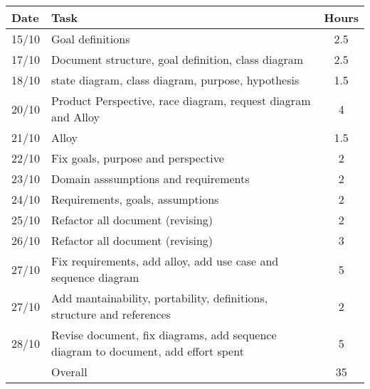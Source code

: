 \begin{table}[H]
\begin{tabularx}{\textwidth}{|l|X|c|}
\hline
\rowcolor[HTML]{C0C0C0} 
Date & Task & Hours\\ \hline
15/10 & Goal definitions & 2.5\\ \hline
17/10 & Document structure, goal definition, class diagram & 2.5\\ \hline
18/10 & state diagram, class diagram, purpose, hypothesis & 1.5\\ \hline
20/10 & Product Perspective, race diagram, request diagram and Alloy & 4\\ \hline
21/10 & Alloy & 1.5 \\ \hline
22/10 & Fix goals, purpose and perspective & 2\\ \hline
23/10 & Domain asssumptions and requirements & 2\\ \hline
24/10 & Requirements, goals, assumptions & 2\\ \hline
25/10 & Refactor all document (revising) & 2\\ \hline
26/10 & Refactor all document (revising) & 3\\ \hline
27/10 & Fix requirements, add alloy, add use case and sequence diagram & 5\\ \hline
27/10 & Add mantainability, portability, definitions, structure and references & 2\\ \hline
28/10 & Revise document, fix diagrams, add sequence diagram to document, add effort spent & 5\\ \hline
\rowcolor[HTML]{C0C0C0} 
& Overall & 35\\ \hline
\end{tabularx}
\end{table}